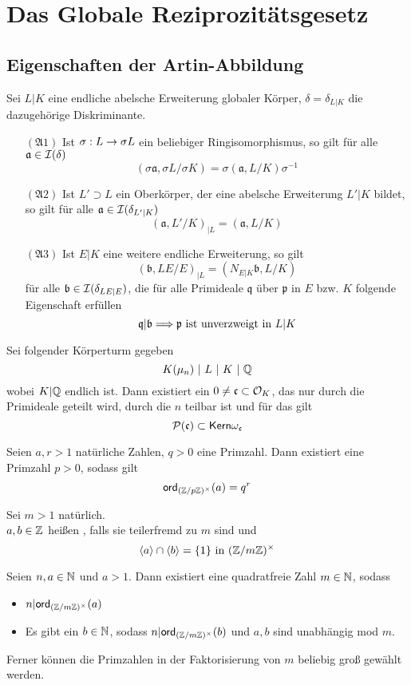 \documentclass{book}
\renewcommand{\i}{^{-1}}
\newcommand{\af}{\mathfrak{a}}
\newcommand{\Af}{\mathfrak{A}}
\renewcommand{\bf}{\mathfrak{b}}
\newcommand{\cf}{\mathfrak{c}}
\newcommand{\pf}{\mathfrak{p}}
\newcommand{\qf}{\mathfrak{q}}
\begin{document}
\chapter{Das Globale Reziprozitätsgesetz}
\section{Eigenschaften der Artin-Abbildung}
\label{Eigenschaften}
Sei $L|K$ eine endliche abelsche Erweiterung globaler Körper, $\delta = \delta_{L|K}$ die dazugehörige Diskriminante.
\begin{itemize}
\item[$(\Af 1)$] Ist $\sigma : L \overset{}{\rightarrow} \sigma L$ ein beliebiger Ringisomorphismus, so gilt für alle $\af \in \I(\delta)$
\[ (\sigma \af, \sigma L / \sigma K) = \sigma (\af , L/K)\sigma\i \]
\item[$(\Af 2)$] Ist $L'\supset L$ ein Oberkörper, der eine abelsche Erweiterung $L'|K$ bildet, so gilt für alle $\af \in \I(\delta_{L'|K})$
\[ (\af, L'/K)_{|L} = (\af, L/K) \]
\item[$(\Af 3)$] Ist $E|K$ eine weitere endliche Erweiterung, so gilt
\[ (\bf, LE /E)_{|L} = (N_{E|K}\bf, L/K) \]
für alle $\bf \in \I(\delta_{LE|E})$, die für alle Primideale $\qf $ über $ \pf$ in $E$ bzw. $K$ folgende Eigenschaft erfüllen
\[ \qf |\bf \Impl{} \pf \text{ ist unverzweigt in }L|K \]
\end{itemize}

\Lem{}
Sei folgender Körperturm gegeben
\[ K(\mu_n) ~|~ L ~|~ K ~|~ \mathbb{Q} \]
wobei $K|\mathbb{Q}$ endlich ist. Dann existiert ein $0\neq \cf \subset \O_K$, das nur durch die Primideale geteilt wird, durch die $n$ teilbar ist und für das gilt
\[ \P(\cf) \subset \Ker \omega_\cf \]

\Lem{}
Seien $a,r > 1$ natürliche Zahlen, $q > 0$ eine Primzahl. Dann existiert eine Primzahl $p > 0$, sodass gilt
\[ \textsf{ord}_{(\mathbb{Z}/p\mathbb{Z})^\times}(a) = q^r \]

Sei $m > 1$ natürlich.\\
$a,b \in \mathbb{Z}$ heißen , falls sie teilerfremd zu $m$ sind und
\[ \left<a\right> \cap \left<b\right> = \{1\}  \text{ in }(\mathbb{Z} /m\mathbb{Z})^\times \]

\Lem{}
Seien $n,a\in \mathbb{N}$ und $a > 1$. Dann existiert eine quadratfreie Zahl $m \in \mathbb{N}$, sodass
\begin{itemize}
\item $n | \textsf{ord}_{(\mathbb{Z}/m\mathbb{Z})^\times}(a)$
\item Es gibt ein $b \in \mathbb{N}$, sodass $n|\textsf{ord}_{(\mathbb{Z}/m\mathbb{Z})^\times}(b)$ und $a,b$ sind unabhängig mod $m$.
\end{itemize} 
Ferner können die Primzahlen in der Faktorisierung von $m$ beliebig groß gewählt werden.
\end{document}
